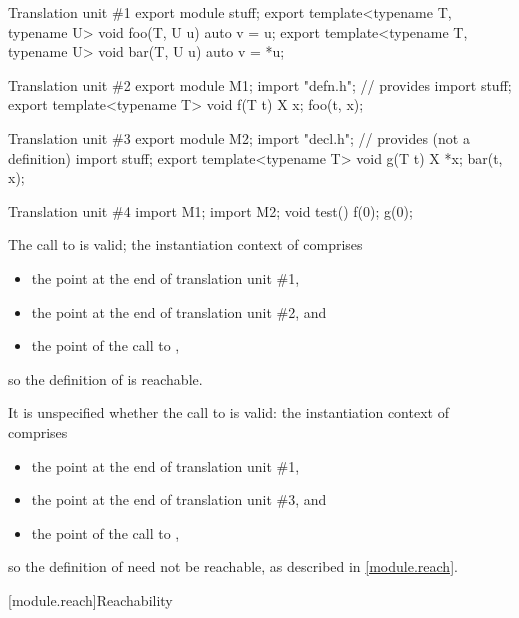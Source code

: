 \pnum
\begin{example}
\begin{codeblocktu}{Translation unit \#1}
export module stuff;
export template<typename T, typename U> void foo(T, U u) { auto v = u; }
export template<typename T, typename U> void bar(T, U u) { auto v = *u; }
\end{codeblocktu}

\begin{codeblocktu}{Translation unit \#2}
export module M1;
import "defn.h";        // provides 
import stuff;
export template<typename T> void f(T t) {
  X x;
  foo(t, x);
}
\end{codeblocktu}

\begin{codeblocktu}{Translation unit \#3}
export module M2;
import "decl.h";        // provides  (not a definition)
import stuff;
export template<typename T> void g(T t) {
  X *x;
  bar(t, x);
}
\end{codeblocktu}

\begin{codeblocktu}{Translation unit \#4}
import M1;
import M2;
void test() {
  f(0);
  g(0);
}
\end{codeblocktu}
The call to  is valid;
the instantiation context of  comprises
\begin{itemize}
\item the point at the end of translation unit \#1,
\item the point at the end of translation unit \#2, and
\item the point of the call to ,
\end{itemize}
so the definition of  is reachable.

It is unspecified whether the call to  is valid:
the instantiation context of  comprises
\begin{itemize}
\item the point at the end of translation unit \#1,
\item the point at the end of translation unit \#3, and
\item the point of the call to ,
\end{itemize}
so the definition of  need not be reachable,
as described in \ref{module.reach}.
\end{example}

[module.reach]{Reachability}

